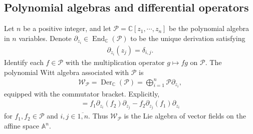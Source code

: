 \documentclass[12pt]{article}
\numberwithin{equation}{section}
\theoremstyle{definition}
\theoremstyle{remark}
\begin{document}
\subsection{Polynomial algebras and differential operators}\label{section2.1}
Let $n$ be a positive integer, and let $\mathscr{P}=\mathbb{C}[z_1,\cdots,z_n]$ be the polynomial algebra in $n$ variables. Denote $\partial_{z_i}\in\operatorname{End}_{\mathbb{C}}(\mathscr{P})$ to be the unique derivation satisfying
\begin{eqnarray}
	\partial_{z_i}(z_j)=\delta_{i,j}.
\end{eqnarray}
Identify each $f\in\mathscr{P}$ with the multiplication operator $g\mapsto fg$ on $\mathscr{P}$. The polynomial Witt algebra associated with $\mathscr{P}$ is
\begin{eqnarray}
	\mathscr{W}_{\mathscr{P}}=\operatorname{Der}_{\mathbb{C}}(\mathscr{P})=\bigoplus_{i=1}^n\mathscr{P}\partial_{z_i},
\end{eqnarray}
equipped with the commutator bracket. Explicitly,
\begin{eqnarray}
	[f_1\partial_{z_i},f_2\partial_{z_j}]=f_1\partial_{z_i}(f_2)\partial_{z_j}-f_2\partial_{z_j}(f_1)\partial_{z_i}
\end{eqnarray}
for $f_1,f_2\in\mathscr{P}$ and $i,j\in\overline{1,n}$. Thus $\mathscr{W}_{\mathscr{P}}$ is the Lie algebra of vector fields on the affine space $\mathbb{A}^n$.
\end{document}
